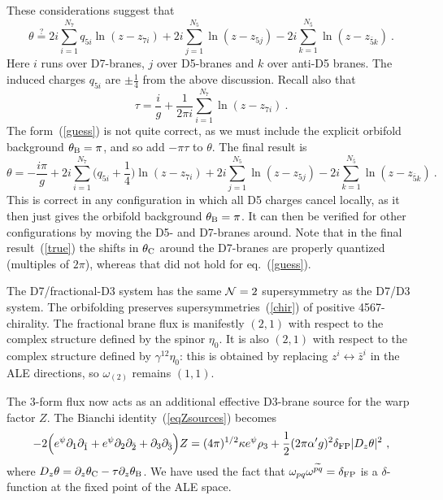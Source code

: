 \documentclass[a4paper,12pt]{article}
\renewcommand{\=}[1]{\bar{#1}}
\begin{document}
These considerations suggest that
\begin{equation}
\theta \stackrel{?}{=} 2 i \sum_{i = 1}^{N_7} q_{5i} \ln(z - z_{7i})
+ 2i  \sum_{j = 1}^{N_5} \ln(z - z_{5j})
- 2i  \sum_{k = 1}^{N_{\bar 5}} \ln(z - z_{\bar 5k})
\ . \label{guess}
\end{equation}
Here $i$ runs over D7-branes, $j$ over D5-branes and $k$ over anti-D5 branes.
The induced charges $q_{5i}$
are $\pm \frac{1}{4}$ from the above discussion.  Recall also that
\begin{equation}
\tau = \frac{i}{g} +
\frac{1}{2\pi i} \sum_{i = 1}^{N_7} \ln(z - z_{7i})\ . \label{tsol}
\end{equation}
The form~(\ref{guess}) is not quite correct, as we must include the explicit
orbifold background $\theta_{\rm B} = \pi$, and so add $-\pi \tau$ to $\theta$.
The final result is
\begin{equation}
\theta {=} -\frac{i\pi}{g} +
2 i \sum_{i = 1}^{N_7} \biggl(q_{5i} + \frac{1}{4}
\biggr)  \ln(z - z_{7i}) + 2i  \sum_{j = 1}^{N_5} \ln(z - z_{5j})
-2i  \sum_{k = 1}^{N_{\bar 5}} \ln(z - z_{\bar 5k})
\ .
\label{true}
\end{equation}
This is correct in any configuration in which all D5 charges cancel locally, as
it then just gives the orbifold background $\theta_{\rm B} = \pi$.  It can
then be verified for other configurations by moving the D5- and D7-branes
around.
Note that in the final result~(\ref{true}) the shifts in $\theta_{\rm C}$ around
the D7-branes are properly quantized (multiples of $2\pi$), whereas that did
not hold for eq.~(\ref{guess}).

The D7/fractional-D3 system has the same ${\cal N}=2$ supersymmetry as the
D7/D3 system.  The orbifolding preserves supersymmetries~(\ref{chir}) of
positive 4567-chirality.  The fractional brane flux is manifestly $(2,1)$ with
respect to the complex structure defined by the spinor $\eta_0$.  It is
also $(2,1)$ with respect to the complex structure defined by $\gamma^{12}
\eta_0$: this is obtained by replacing $z^i \leftrightarrow \bar z^i$ in the
ALE directions, so $\omega_{(2)}$ remains $(1,1)$.


The 3-form flux now acts as an additional effective D3-brane source for the warp
factor $Z$.  The Bianchi identity~(\ref{eqZsources}) becomes
\begin{equation}
- 2\Bigl(e^{\psi} \partial_1
\partial_{\bar{1}}+e^{\psi} \partial_2 \partial_{\bar{2}}+
\partial_3 \partial_{\bar{3}} \Bigr) Z =
(4\pi)^{1/2} \kappa e^{\psi} \rho_3
+ \frac{1}{2} (2\pi\alpha'g)^2
\delta_{\rm FP} |D_z \theta|^2 \ ,
\label{3den2}
\end{equation}
where $D_z\theta = \partial_z \theta_{\rm C} - \tau \partial_z \theta_{\rm B}$.
We have used the fact that $\omega_{pq} \omega^{\widetilde{pq}} =
\delta_{\rm FP}$ is a $\delta$-function at the fixed point of the ALE space.
\end{document}
